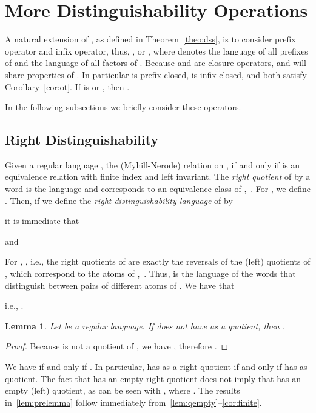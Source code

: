 \documentclass{article}
\newtheorem{lemma}{Lemma}
\begin{document}
\section{More Distinguishability Operations}
\label{sec:otherdis}
A natural extension of , as defined in Theorem~\ref{theo:dss}, is to consider prefix operator and infix operator, thus,
, or
, where  denotes the language of all prefixes of  and  the language of all factors of .
Because  and  are closure operators,  and   will share properties of  . In particular  is prefix-closed,  is infix-closed, and both satisfy Corollary~\ref{cor:ot}. If  is  or , then .




In the following subsections we briefly consider these operators.

\subsection{Right Distinguishability}
\label{sec:rightdis}
Given a regular language , the (Myhill-Nerode) relation on ,  if and only if  is an equivalence relation with finite index and  left invariant. The \emph{right quotient} of  by a word  is the language  and corresponds to an equivalence class of ,~\cite{champarnaud13:_two_sided_deriv_for_regul,sakarovitch09:_elemen_of_autom_theor}.
For , we define . Then, if we define
the \emph{right distinguishability language} of  by 

\noindent it is immediate that 

and

For , , i.e., the right quotients of  are exactly the reversals of the (left) quotients of , which  correspond to  the atoms of ,~\cite{brzozowski11:_theor_of_atomat}. Thus,  is the language of the words that distinguish between pairs of different atoms  of .
We have that 

i.e., . 

\begin{lemma}
\label{lem:qepref}
Let  be a regular language. If  does not have  as a quotient, then  .
\end{lemma}
\begin{proof}
Because  is not a quotient of , we have
 , therefore .
\end{proof}

We have   if and only if . 
In particular,  has  as a right quotient if and only if   has  as quotient.
The fact that   has an empty  right quotient does not imply that  has an empty (left) quotient, as can be seen with , where  .
 The results in~\ref{lem:prelemma} follow immediately from~\ref{lem:qempty}--\ref{cor:finite}. 
\end{document}
